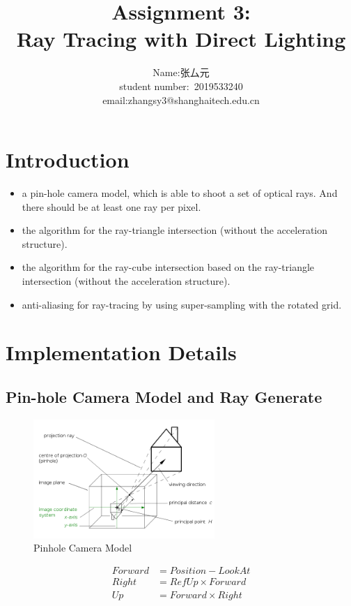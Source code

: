 \documentclass[acmtog]{acmart}
\title{Assignment 3:\\ {Ray Tracing with Direct Lighting}}
\author{Name:\quad 张厶元  \\ student number:\ 2019533240
\\email:\quad zhangsy3@shanghaitech.edu.cn}
\begin{document}
\maketitle

\vspace*{2 ex}

\section{Introduction}
\begin{itemize}
\item a pin-hole camera model, which is able to shoot a set of optical rays. And there should be at least one ray per pixel.
\item the algorithm for the ray-triangle intersection (without the acceleration structure).
\item the algorithm for the ray-cube intersection based on the ray-triangle intersection (without the acceleration structure).
\item anti-aliasing for ray-tracing by using super-sampling with the rotated grid.
\end{itemize}
\section{Implementation Details}
\subsection{Pin-hole Camera Model and Ray Generate}
\begin{figure}[h]
	\centering
	\includegraphics[height = 4.5cm]{Pinhole_camera_model.png}
	\caption{Pinhole Camera Model}
\end{figure}
\begin{equation}
\begin{split}
	Forward &= Position - LookAt \\
	Right &= RefUp \times Forward \\
	Up &= Forward \times Right \\
\end{split}
\end{equation}
\end{document}
